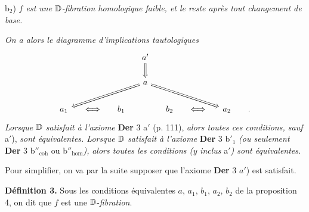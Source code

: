 b$_2$) \textit{$f$ est une $\mathbb{D}$-fibration homologique faible, et le reste après tout changement de base.}

\textit{On a alors le diagramme d'implications tautologiques}
\[
\begin{tikzcd}[column sep=small]
& & & a' \arrow[d, Rightarrow] & & & & \\
& & & a \arrow[dlll, Rightarrow] \arrow[drrr, Rightarrow] & & & & \\
a_1 & \Longleftrightarrow & b_1 & & b_2 & \Longleftrightarrow & a_2 & .
\end{tikzcd}
\]
\textit{Lorsque $\mathbb{D}$ satisfait à l'axiome} \textbf{Der} 3 a$'$ (p. 111), \textit{alors toutes ces conditions, sauf} a$'$), \textit{sont équivalentes. Lorsque $\mathbb{D}$ satisfait à l'axiome} \textbf{Der} 3 b$'_1$ \textit{(ou seulement} \textbf{Der} 3 b$''_{\mathrm{coh}}$ ou b$''_{\mathrm{hom}}$\textit{),} \textit{alors toutes les conditions (y inclus} a$'$\textit{) sont équivalentes.}

Pour simplifier, on va par la suite supposer que l'axiome \textbf{Der} 3 $a'$) est satisfait.

\textbf{Définition 3.} Sous les conditions équivalentes $a$, $a_1$, $b_1$, $a_2$, $b_2$ de la proposition 4, on dit que $f$ est une $\mathbb{D}$-\textit{fibration}. %

